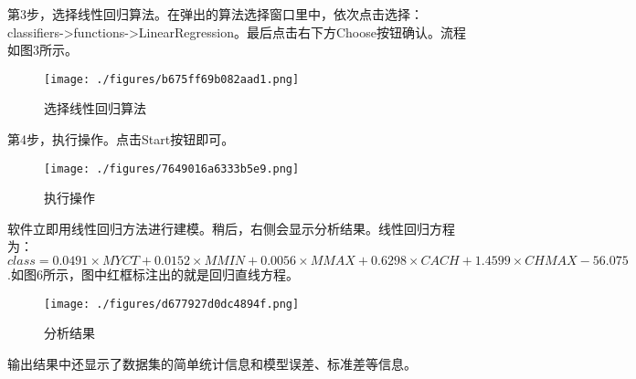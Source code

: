 第3步，选择线性回归算法。在弹出的算法选择窗口里中，依次点击选择：classifiers->functions->LinearRegression。最后点击右下方Choose按钮确认。流程如图3所示。
\begin{figure}[ht]
\centering
\texttt{[image: ./figures/b675ff69b082aad1.png]}
\caption{选择线性回归算法} \label{fig_LiGr_3}
\end{figure}

第4步，执行操作。点击Start按钮即可。
\begin{figure}[ht]
\centering
\texttt{[image: ./figures/7649016a6333b5e9.png]}
\caption{执行操作} \label{fig_LiGr_4}
\end{figure}

软件立即用线性回归方法进行建模。稍后，右侧会显示分析结果。线性回归方程为：$class=0.0491 \times MYCT+0.0152 \times MMIN+0.0056 \times MMAX+0.6298 \times CACH+1.4599 \times CHMAX-56.075$.如图6所示，图中红框标注出的就是回归直线方程。
\begin{figure}[ht]
\centering
\texttt{[image: ./figures/d677927d0dc4894f.png]}
\caption{分析结果} \label{fig_LiGr_6}
\end{figure}
输出结果中还显示了数据集的简单统计信息和模型误差、标准差等信息。